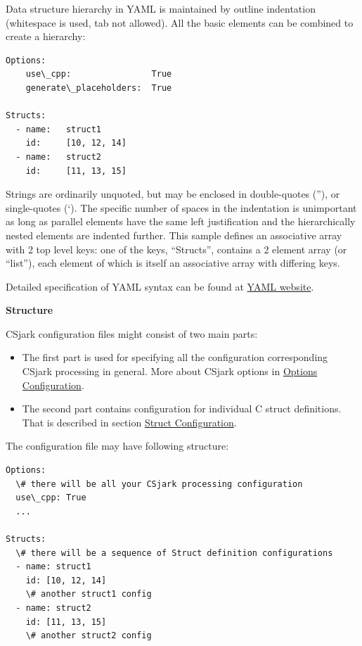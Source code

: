 \documentclass[A4paper,10pt,english]{sphinxmanual}
\begin{document}
Data structure hierarchy in YAML is maintained by outline indentation (whitespace is used, tab not allowed). All the basic elements can be combined to create a hierarchy:

\begin{Verbatim}[commandchars=\\\{\}]
Options:
    use\_cpp:                True
    generate\_placeholders:  True

Structs:
  - name:   struct1
    id:     [10, 12, 14]
  - name:   struct2
    id:     [11, 13, 15]
\end{Verbatim}

Strings are ordinarily unquoted, but may be enclosed in double-quotes (''), or single-quotes (`). The specific number of spaces in the indentation is unimportant as long as parallel elements have the same left justification and the hierarchically nested elements are indented further. This sample defines an associative array with 2 top level keys: one of the keys, ``Structs'', contains a 2 element array (or ``list''), each element of which is itself an associative array with differing keys.

Detailed specification of YAML syntax can be found at \href{http://www.yaml.org/spec/1.2/spec.html}{YAML website}.

\textbf{Structure}

CSjark configuration files might consist of two main parts:
\begin{itemize}
\item {} 
The first part is used for specifying all the configuration corresponding CSjark processing in general. More about CSjark options in {\hyperref[user/config:options-configuration]{Options Configuration}}.

\item {} 
The second part contains configuration for individual C struct definitions. That is described in section {\hyperref[user/config:struct-configuration]{Struct Configuration}}.

\end{itemize}

The configuration file may have following structure:

\begin{Verbatim}[commandchars=\\\{\}]
Options:
  \# there will be all your CSjark processing configuration
  use\_cpp: True
  ...

Structs:
  \# there will be a sequence of Struct definition configurations
  - name: struct1
    id: [10, 12, 14]
    \# another struct1 config
  - name: struct2
    id: [11, 13, 15]
    \# another struct2 config
\end{Verbatim}
\end{document}
